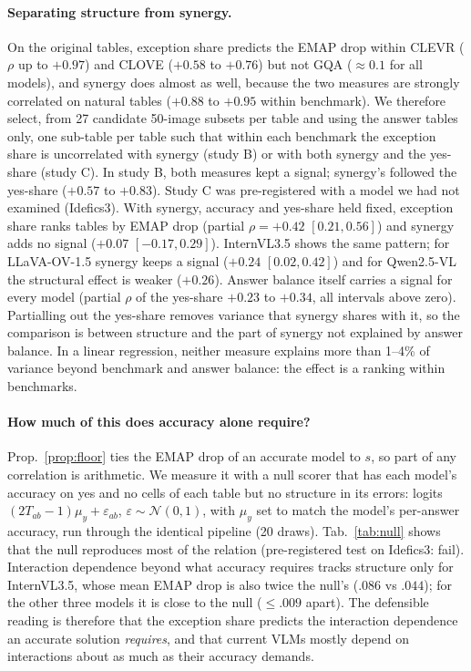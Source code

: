 \paragraph{Separating structure from synergy.}
On the original tables, exception share predicts the EMAP drop within CLEVR ($\rho$ up to $+0.97$) and CLOVE ($+0.58$
to $+0.76$) but not GQA ($\approx0.1$ for all models), and synergy does almost as well, because the two measures are
strongly correlated on natural tables ($+0.88$ to $+0.95$ within benchmark). We therefore select, from 27 candidate
50-image subsets per table and using the answer tables only, one sub-table per table such that within each benchmark
the exception share is uncorrelated with synergy (study B) or with both synergy and the yes-share (study C). In study B,
both measures kept a signal; synergy's followed the yes-share ($+0.57$ to $+0.83$). Study C was pre-registered with a
model we had not examined (Idefics3). With synergy, accuracy and yes-share held fixed, exception share ranks tables by
EMAP drop (partial $\rho=+0.42$ $[0.21,0.56]$) and synergy adds no signal ($+0.07$ $[-0.17,0.29]$). InternVL3.5 shows
the same pattern; for LLaVA-OV-1.5 synergy keeps a signal ($+0.24$ $[0.02,0.42]$) and for Qwen2.5-VL the structural
effect is weaker ($+0.26$). Answer balance itself carries a signal for every model (partial $\rho$ of the yes-share
$+0.23$ to $+0.34$, all intervals above zero). Partialling out the yes-share removes variance that synergy shares with
it, so the comparison is between structure and the part of synergy not explained by answer balance. In a linear
regression, neither measure explains more than 1--4\% of variance beyond benchmark and answer balance: the effect is a
ranking within benchmarks.

\paragraph{How much of this does accuracy alone require?}
Prop.~\ref{prop:floor} ties the EMAP drop of an accurate model to $s$, so part of any correlation is arithmetic. We
measure it with a null scorer that has each model's accuracy on yes and no cells of each table but no structure in its
errors: logits $(2T_{ab}-1)\mu_y+\varepsilon_{ab}$, $\varepsilon\sim\mathcal N(0,1)$, with $\mu_y$ set to match the
model's per-answer accuracy, run through the identical pipeline (20 draws). Tab.~\ref{tab:null} shows that the null
reproduces most of the relation (pre-registered test on Idefics3: fail). Interaction dependence beyond what accuracy
requires tracks structure only for InternVL3.5, whose mean EMAP drop is also twice the null's ($.086$ vs $.044$); for
the other three models it is close to the null ($\le .009$ apart). The defensible reading is therefore that the
exception share predicts the interaction dependence an accurate solution \emph{requires}, and that current VLMs mostly
depend on interactions about as much as their accuracy demands.

